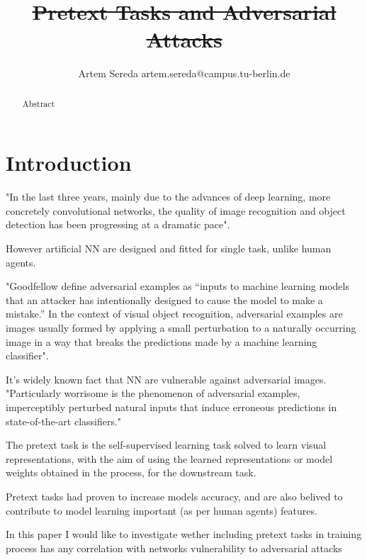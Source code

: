 \documentclass[12pt]{extarticle}
\title{\st{Pretext Tasks and Adversarial Attacks}}
\author{Artem Sereda artem.sereda@campus.tu-berlin.de}
\begin{document}
\maketitle

\begin{abstract}
\normalsize
Abstract
\end{abstract}

\section{Introduction}
\cite{russakovsky2015imagenet} "In the last three years, mainly due to the advances of deep learning, more concretely convolutional
networks, the quality of image recognition and object detection has been progressing at a dramatic pace". \newline

However artificial NN are designed and fitted for single task, unlike human agents. \newline

\cite{DBLP:journals/corr/abs-1802-08195} "Goodfellow define adversarial examples as “inputs to machine learning models that an
attacker has intentionally designed to cause the model to make a mistake.” In the context of visual
object recognition, adversarial examples are images usually formed by applying a small perturbation
to a naturally occurring image in a way that breaks the predictions made by a machine learning
classifier". \newline

It’s widely known fact that NN are vulnerable against adversarial images. \newline
\cite{ilyas2019adversarial} "Particularly worrisome is the phenomenon of adversarial examples, imperceptibly perturbed natural inputs that induce erroneous predictions in state-of-the-art classifiers."\newline

The pretext task is the self-supervised learning task solved to learn visual representations, with the aim of using the learned representations or model weights obtained in the process, for the downstream task. \newline 

\cite{kolesnikov2019revisiting} Pretext tasks had proven to increase models accuracy, and are also belived to contribute to model learning important (as per human agents) features. \newline

In this paper I would like to investigate wether including pretext tasks in training process has any correlation with networks vulnerability to adversarial attacks
\end{document}

